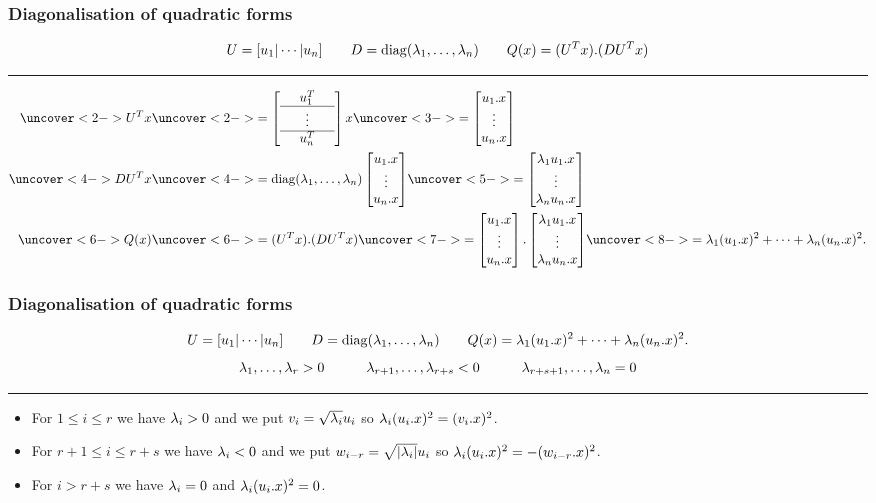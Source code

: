 \documentclass[9pt]{beamer}
\begin{document}
\begin{frame}[t]
 \frametitle{Diagonalisation of quadratic forms}
 \[ U=[u_1|\dotsb|u_n] \qquad
    D=\operatorname{diag}(\lambda_1,\dotsc,\lambda_n) \qquad
    Q(x) = (U^Tx).(DU^Tx)
 \]

 \medskip

 \hrule
 
 \medskip

  \begin{align*}
   \uc<2->{U^Tx} & 
    \uc<2->{= \left[\begin{array}{ccc}
     & u_1^T & \\ \hline
     & \vdots & \\ \hline
     & u_n^T & 
    \end{array}\right]
    x }
    \uc<3->{= \bbm u_1.x \\ \vdots \\ u_n.x \ebm} \\
   \uc<4->{DU^Tx} &\uc<4->{= 
    \diag(\lm_1,\dotsc,\lm_n) 
    \bbm u_1.x \\ \vdots \\ u_n.x \ebm} 
    \uc<5->{= 
    \bbm \lm_1 u_1.x \\ \vdots \\ \lm_n u_n.x \ebm} \\
   \uc<6->{Q(x)} &\uc<6->{= (U^Tx).(DU^Tx)}
    \uc<7->{= \bbm u_1.x \\ \vdots \\ u_n.x \ebm . 
    \bbm \lm_1 u_1.x \\ \vdots \\ \lm_n u_n.x \ebm}
    \uc<8->{= \lm_1(u_1.x)^2 + \dotsb + \lm_n(u_n.x)^2.}
  \end{align*}
\end{frame}

\begin{frame}[t]
 \frametitle{Diagonalisation of quadratic forms}
 \[ U=[u_1|\dotsb|u_n] \qquad
    D=\operatorname{diag}(\lambda_1,\dotsc,\lambda_n) \qquad
    Q(x) = \lambda_1(u_1.x)^2 + \dotsb + \lambda_n(u_n.x)^2.
 \]
 \[ \lambda_1,\dotsc,\lambda_r>0 \hspace{3em}
    \lambda_{r+1},\dotsc,\lambda_{r+s}<0 \hspace{3em}
    \lambda_{r+s+1},\dotsc,\lambda_n=0
 \]
 \medskip

 \hrule
 
 \medskip
 \begin{itemize}
  \item<2-> For $1\leq i\leq r$ we have $\lambda_i>0$ and we put
   $v_i=\sqrt{\lambda_i}u_i$ so $\lambda_i(u_i.x)^2=(v_i.x)^2$.  
  \item<3-> For $r+1\leq i\leq r+s$ we have $\lambda_i<0$ and we put
   $w_{i-r}=\sqrt{|\lambda_i|}u_i$ so $\lambda_i(u_i.x)^2=-(w_{i-r}.x)^2$.
  \item<4-> For $i>r+s$ we have $\lambda_i=0$ and $\lambda_i(u_i.x)^2=0$. 
 \end{itemize}

\end{frame}
\end{document}
